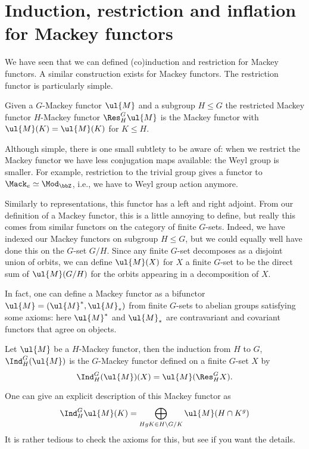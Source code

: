 \documentclass{willowtreebook}
\begin{document}
\section{Induction, restriction and inflation for Mackey functors}
We have seen that we can defined (co)induction and restriction for Mackey functors. A similar construction exists for Mackey functors. The restriction functor is particularly simple. 
\begin{definition}
    Given a $G$-Mackey functor $\ul{M}$ and a subgroup $H \le G$ the restricted Mackey functor $H$-Mackey functor $\Res^G_H\ul{M}$ is the Mackey functor with $\ul{M}(K) = \ul{M}(K)$ for $K \le H$. 
\end{definition}
\begin{remark}
    Although simple, there is one small subtlety to be aware of: when we restrict the Mackey functor we have less conjugation maps available: the Weyl group is smaller. For example, restriction to the trivial group gives a functor to $\Mack_{e} \simeq \Mod_{\bbZ}$, i.e., we have to Weyl group action anymore. 
\end{remark}
\begin{remark}
    Similarly to representations, this functor has a left and right adjoint. From our definition of a Mackey functor, this is a little annoying to define, but really this comes from similar functors on the category of finite $G$-sets. Indeed, we have indexed our Mackey functors on subgroup $H \le G$, but we could equally well have done this on the $G$-set $G/H$. Since any finite $G$-set decomposes as a disjoint union of orbits, we can define $\ul{M}(X)$ for $X$ a finite $G$-set to be the direct sum of $\ul{M}(G/H)$ for the orbits appearing in a decomposition of $X$. 

    In fact, one can define a Mackey functor as a bifunctor $\ul{M} = (\ul{M}^*,\ul{M}_*)$ from finite $G$-sets to abelian groups satisfying some axioms: here $\ul{M}^*$ and $\ul{M}_*$ are contravariant and covariant functors that agree on objects. 
\end{remark}
\begin{definition}
    Let $\ul{M}$ be a $H$-Mackey functor, then the induction from $H$ to $G$, $\Ind_H^G(\ul{M})$ is the $G$-Mackey functor defined on a finite $G$-set $X$ by
    \[
    \Ind_H^G(\ul{M})(X) = \ul{M}(\Res^G_HX). 
    \]
\end{definition}
\begin{remark}
    One can give an explicit description of this Mackey functor as
    \[
    \Ind_H^G\ul{M}(K) = \bigoplus_{HgK \in H \backslash G/K} \ul{M}(H \cap K^g)
    \]
    It is rather tedious to check the axioms for this, but see \cite[Section 2]{Sasaki1982Green} if you want the details.
\end{remark}
\end{document}
